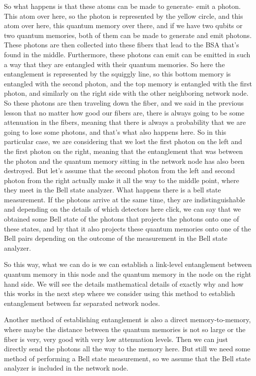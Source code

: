 So what happens is that these atoms can be made to generate- emit a photon. This atom over here, so the photon is represented by the yellow circle, and this atom over here, this quantum memory over there, and if we have two qubits or two quantum memories, both of them can be made to generate and emit photons. These photons are then collected into these fibers that lead to the BSA that's found in the middle. Furthermore, these photons can emit can be emitted in such a way that they are entangled with their quantum memories. So here the entanglement is represented by the squiggly line, so this bottom memory is entangled with the second photon, and the top memory is entangled with the first photon, and similarly on the right side with the other neighboring network node. So these photons are then traveling down the fiber, and we said in the previous lesson that no matter how good our fibers are, there is always going to be some attenuation in the fibers, meaning that there is always a probability that we are going to lose some photons, and that's what also happens here. So in this particular case, we are considering that we lost the first photon on the left and the first photon on the right, meaning that the entanglement that was between the photon and the quantum memory sitting in the network node has also been destroyed. But let's assume that the second photon from the left and second photon from the right actually make it all the way to the middle point, where they meet in the Bell state analyzer. What happens there is a bell state measurement. If the photons arrive at the same time, they are indistinguishable and depending on the details of which detectors here click, we can say that we obtained some Bell state of the photons that projects the photons onto one of these states, and by that it also projects these quantum memories onto one of the Bell pairs depending on the outcome of the measurement in the Bell state analyzer.

So this way, what we can do is we can establish a link-level entanglement between quantum memory in this node and the quantum memory in the node on the right hand side. We will see the details mathematical details of exactly why and how this works in the next step where we consider using this method to establish entanglement between far separated network nodes.

Another method of establishing entanglement is also a direct memory-to-memory, where maybe the distance between the quantum memories is not so large or the fiber is very, very good with very low attenuation levels. Then we can just directly send the photons all the way to the memory here. But still we need some method of performing a Bell state measurement, so we assume that the Bell state analyzer is included in the network node.


